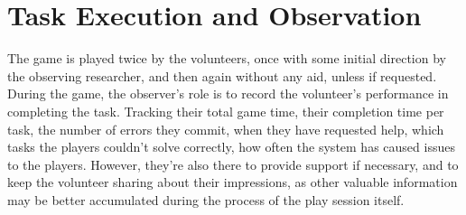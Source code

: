 \section{Task Execution and Observation} \label{sec:results_game}
    The game is played twice by the volunteers, once with some initial direction by the observing researcher, and then again without any aid, unless if requested. During the game, the observer’s role is to record the volunteer’s performance in completing the task. Tracking their total game time, their completion time per task, the number of errors they commit, when they have requested help, which tasks the players couldn’t solve correctly, how often the system has caused issues to the players. However, they’re also there to provide support if necessary, and to keep the volunteer sharing about their impressions, as other valuable information may be better accumulated during the process of the play session itself.\\

